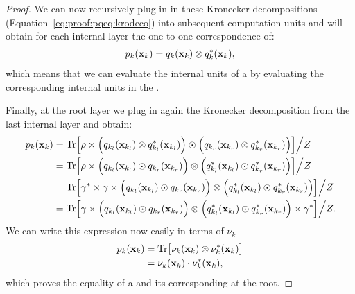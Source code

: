 \begin{proof}
	We can now recursively plug in in these Kronecker decompositions (\cf Equation~\ref{eq:proof:pqeq:krodeco}) into subsequent computation units and will obtain for each internal layer the one-to-one correspondence of:
	\begin{align}
		p_k(\mathbf{x}_k) =q_k(\mathbf{x}_k) \otimes q^*_k(\mathbf{x}_k),
	\end{align}
	which means that we can evaluate the internal units of a \poc by evaluating the corresponding internal units in the \pvc.

	Finally, at the root layer we plug in again the Kronecker decomposition from the last internal layer and obtain:
	\begin{align}
		\circuit_k(\xvars_k)
		 &
		=
		\Trace
		\Bigl[
			\rho
			\times
			\Bigl(
			\xircuit_{k_l}(\xvars_{k_l}) \otimes \xircuit^*_{k_l}(\xvars_{k_l})
			\Bigr)
			\odot
			\Bigl(
			\xircuit_{k_r}(\xvars_{k_r}) \otimes \xircuit^*_{k_r}(\xvars_{k_r})
			\Bigr)
			\Bigr]
		\Big/ Z
		\\
		 &
		=
		\Trace
		\Bigl[
			\rho
			\times
			\Bigl(
			\xircuit_{k_l}(\xvars_{k_l}) \odot \xircuit_{k_r}(\xvars_{k_r})
			\Bigr)
			\otimes
			\Bigl(
			\xircuit^*_{k_l}(\xvars_{k_l}) \odot \xircuit^*_{k_r}(\xvars_{k_r})
			\Bigr)
			\Bigr]
		\Big/ Z
		\\
		 &
		=
		\Trace
		\Bigl[
			\gamma^*
			\times
			\gamma
			\times
			\Bigl(
			\xircuit_{k_l}(\xvars_{k_l}) \odot \xircuit_{k_r}(\xvars_{k_r})
			\Bigr)
			\otimes
			\Bigl(
			\xircuit^*_{k_l}(\xvars_{k_l}) \odot \xircuit^*_{k_r}(\xvars_{k_r})
			\Bigr)
			\Bigr]
		\Big/ Z
		\\
		 &
		=
		\Trace
		\Bigl[
			\gamma
			\times
			\Bigl(
			\xircuit_{k_l}(\xvars_{k_l}) \odot \xircuit_{k_r}(\xvars_{k_r})
			\Bigr)
			\otimes
			\Bigl(
			\xircuit^*_{k_l}(\xvars_{k_l}) \odot \xircuit^*_{k_r}(\xvars_{k_r})
			\Bigr)
			\times
			\gamma^*
			\Bigr]
		\Big/ Z.
	\end{align}
	We can write this expression now easily in terms of $\nu_k$
	\begin{align}
		\circuit_k(\xvars_k)
		 &
		=
		\Trace \bigl[ \nu_{k}(\xvars_k) \otimes \nu^*_{k}(\xvars_k) \bigr]
		\\
		 &
		= \nu_{k}(\xvars_k) \cdot \nu^*_{k}(\xvars_k),
	\end{align}
	which proves the equality of a \poc and its corresponding \pvc at the root.
\end{proof}


